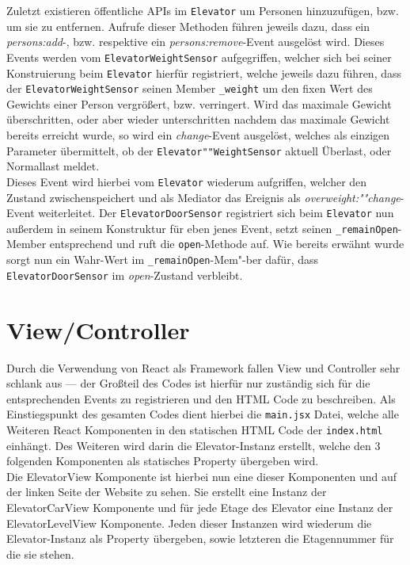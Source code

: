Zuletzt existieren öffentliche APIs im \texttt{Elevator} um Personen hinzuzufügen, bzw. um sie zu entfernen.
Aufrufe dieser Methoden führen jeweils dazu, dass ein \textit{persons:add}-, bzw. respektive ein \textit{persons:remove}-Event ausgelöst wird.
Dieses Events werden vom \texttt{ElevatorWeightSensor} aufgegriffen, welcher sich bei seiner Konstruierung beim \texttt{Elevator} hierfür registriert, welche jeweils dazu führen, dass der \texttt{ElevatorWeightSensor} seinen Member \texttt{\_weight} um den fixen Wert des Gewichts einer Person vergrößert, bzw. verringert.
Wird das maximale Gewicht überschritten, oder aber wieder unterschritten nachdem das maximale Gewicht bereits erreicht wurde, so wird ein \textit{change}-Event ausgelöst, welches als einzigen Parameter übermittelt, ob der \texttt{Elevator""WeightSensor} aktuell Überlast, oder Normallast meldet. \\

Dieses Event wird hierbei vom \texttt{Elevator} wiederum aufgriffen, welcher den Zustand zwischenspeichert und als Mediator das Ereignis als \textit{overweight:""change}-Event weiterleitet.
Der \texttt{ElevatorDoorSensor} registriert sich beim \texttt{Elevator} nun außerdem in seinem Konstruktur für eben jenes Event, setzt seinen \texttt{\_remainOpen}-Member entsprechend und ruft die \texttt{open}-Methode auf.
Wie bereits erwähnt wurde sorgt nun ein Wahr-Wert im \texttt{\_remainOpen}-Mem"-ber dafür, dass \texttt{ElevatorDoorSensor} im \textit{open}-Zustand verbleibt.

\section{View/Controller}
\label{imp_vc}
Durch die Verwendung von React als Framework fallen View und Controller sehr schlank aus --- der Großteil des Codes ist hierfür nur zuständig sich für die entsprechenden Events zu registrieren und den HTML Code zu beschreiben.
Als Einstiegspunkt des gesamten Codes dient hierbei die \texttt{main.jsx} Datei, welche alle Weiteren React Komponenten in den statischen HTML Code der \texttt{index.html} einhängt.
Des Weiteren wird darin die Elevator-Instanz erstellt, welche den 3 folgenden Komponenten als statisches Property übergeben wird. \\

Die ElevatorView Komponente ist hierbei nun eine dieser Komponenten und auf der linken Seite der Website zu sehen.
Sie erstellt eine Instanz der ElevatorCarView Komponente und für jede Etage des Elevator eine Instanz der ElevatorLevelView Komponente.
Jeden dieser Instanzen wird wiederum die Elevator-Instanz als Property übergeben, sowie letzteren die Etagennummer für die sie stehen. \\

